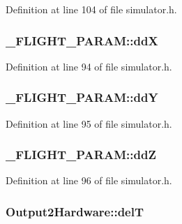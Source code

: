 Definition at line 104 of file simulator.\-h.

\hypertarget{group___h_i_t_l_plugin_gabb56dcac3d6e652f79e4a2fd79322e66}{
\subsubsection[{dd\-X}]{ \-\_\-\-F\-L\-I\-G\-H\-T\-\_\-\-P\-A\-R\-A\-M\-::dd\-X}}\label{group___h_i_t_l_plugin_gabb56dcac3d6e652f79e4a2fd79322e66}


Definition at line 94 of file simulator.\-h.

\hypertarget{group___h_i_t_l_plugin_ga076f6e2f6b3ce2a8f01d26b3a7dac1bd}{
\subsubsection[{dd\-Y}]{ \-\_\-\-F\-L\-I\-G\-H\-T\-\_\-\-P\-A\-R\-A\-M\-::dd\-Y}}\label{group___h_i_t_l_plugin_ga076f6e2f6b3ce2a8f01d26b3a7dac1bd}


Definition at line 95 of file simulator.\-h.

\hypertarget{group___h_i_t_l_plugin_ga7961abcc14db01ab5ba42c426e2160c5}{
\subsubsection[{dd\-Z}]{ \-\_\-\-F\-L\-I\-G\-H\-T\-\_\-\-P\-A\-R\-A\-M\-::dd\-Z}}\label{group___h_i_t_l_plugin_ga7961abcc14db01ab5ba42c426e2160c5}


Definition at line 96 of file simulator.\-h.

\hypertarget{group___h_i_t_l_plugin_gadbdb09f62a5ce0e914e8551ce3bd0bbd}{
\subsubsection[{del\-T}]{ Output2\-Hardware\-::del\-T}}\label{group___h_i_t_l_plugin_gadbdb09f62a5ce0e914e8551ce3bd0bbd}


